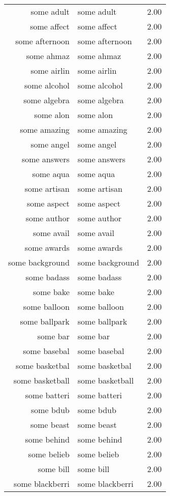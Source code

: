 \begin{table}[ht]
\begin{tabular}{rlr}
  some adult & some adult & 2.00 \\ 
  some affect & some affect & 2.00 \\ 
  some afternoon & some afternoon & 2.00 \\ 
  some ahmaz & some ahmaz & 2.00 \\ 
  some airlin & some airlin & 2.00 \\ 
  some alcohol & some alcohol & 2.00 \\ 
  some algebra & some algebra & 2.00 \\ 
  some alon & some alon & 2.00 \\ 
  some amazing & some amazing & 2.00 \\ 
  some angel & some angel & 2.00 \\ 
  some answers & some answers & 2.00 \\ 
  some aqua & some aqua & 2.00 \\ 
  some artisan & some artisan & 2.00 \\ 
  some aspect & some aspect & 2.00 \\ 
  some author & some author & 2.00 \\ 
  some avail & some avail & 2.00 \\ 
  some awards & some awards & 2.00 \\ 
  some background & some background & 2.00 \\ 
  some badass & some badass & 2.00 \\ 
  some bake & some bake & 2.00 \\ 
  some balloon & some balloon & 2.00 \\ 
  some ballpark & some ballpark & 2.00 \\ 
  some bar & some bar & 2.00 \\ 
  some basebal & some basebal & 2.00 \\ 
  some basketbal & some basketbal & 2.00 \\ 
  some basketball & some basketball & 2.00 \\ 
  some batteri & some batteri & 2.00 \\ 
  some bdub & some bdub & 2.00 \\ 
  some beast & some beast & 2.00 \\ 
  some behind & some behind & 2.00 \\ 
  some belieb & some belieb & 2.00 \\ 
  some bill & some bill & 2.00 \\ 
  some blackberri & some blackberri & 2.00 \\ 

\end{tabular}
\end{table}
